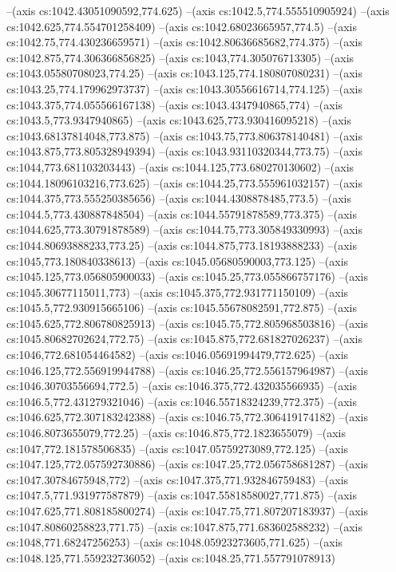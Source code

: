 --(axis cs:1042.43051090592,774.625)
--(axis cs:1042.5,774.555510905924)
--(axis cs:1042.625,774.554701258409)
--(axis cs:1042.68023665957,774.5)
--(axis cs:1042.75,774.430236659571)
--(axis cs:1042.80636685682,774.375)
--(axis cs:1042.875,774.306366856825)
--(axis cs:1043,774.305076713305)
--(axis cs:1043.05580708023,774.25)
--(axis cs:1043.125,774.180807080231)
--(axis cs:1043.25,774.179962973737)
--(axis cs:1043.30556616714,774.125)
--(axis cs:1043.375,774.055566167138)
--(axis cs:1043.4347940865,774)
--(axis cs:1043.5,773.9347940865)
--(axis cs:1043.625,773.930416095218)
--(axis cs:1043.68137814048,773.875)
--(axis cs:1043.75,773.806378140481)
--(axis cs:1043.875,773.805328949394)
--(axis cs:1043.93110320344,773.75)
--(axis cs:1044,773.681103203443)
--(axis cs:1044.125,773.680270130602)
--(axis cs:1044.18096103216,773.625)
--(axis cs:1044.25,773.555961032157)
--(axis cs:1044.375,773.555250385656)
--(axis cs:1044.4308878485,773.5)
--(axis cs:1044.5,773.430887848504)
--(axis cs:1044.55791878589,773.375)
--(axis cs:1044.625,773.30791878589)
--(axis cs:1044.75,773.305849330993)
--(axis cs:1044.80693888233,773.25)
--(axis cs:1044.875,773.18193888233)
--(axis cs:1045,773.180840338613)
--(axis cs:1045.05680590003,773.125)
--(axis cs:1045.125,773.056805900033)
--(axis cs:1045.25,773.055866757176)
--(axis cs:1045.30677115011,773)
--(axis cs:1045.375,772.931771150109)
--(axis cs:1045.5,772.930915665106)
--(axis cs:1045.55678082591,772.875)
--(axis cs:1045.625,772.806780825913)
--(axis cs:1045.75,772.805968503816)
--(axis cs:1045.80682702624,772.75)
--(axis cs:1045.875,772.681827026237)
--(axis cs:1046,772.681054464582)
--(axis cs:1046.05691994479,772.625)
--(axis cs:1046.125,772.556919944788)
--(axis cs:1046.25,772.556157964987)
--(axis cs:1046.30703556694,772.5)
--(axis cs:1046.375,772.432035566935)
--(axis cs:1046.5,772.431279321046)
--(axis cs:1046.55718324239,772.375)
--(axis cs:1046.625,772.307183242388)
--(axis cs:1046.75,772.306419174182)
--(axis cs:1046.8073655079,772.25)
--(axis cs:1046.875,772.1823655079)
--(axis cs:1047,772.181578506835)
--(axis cs:1047.05759273089,772.125)
--(axis cs:1047.125,772.057592730886)
--(axis cs:1047.25,772.056758681287)
--(axis cs:1047.30784675948,772)
--(axis cs:1047.375,771.932846759483)
--(axis cs:1047.5,771.931977587879)
--(axis cs:1047.55818580027,771.875)
--(axis cs:1047.625,771.808185800274)
--(axis cs:1047.75,771.807207183937)
--(axis cs:1047.80860258823,771.75)
--(axis cs:1047.875,771.683602588232)
--(axis cs:1048,771.68247256253)
--(axis cs:1048.05923273605,771.625)
--(axis cs:1048.125,771.559232736052)
--(axis cs:1048.25,771.557791078913)
